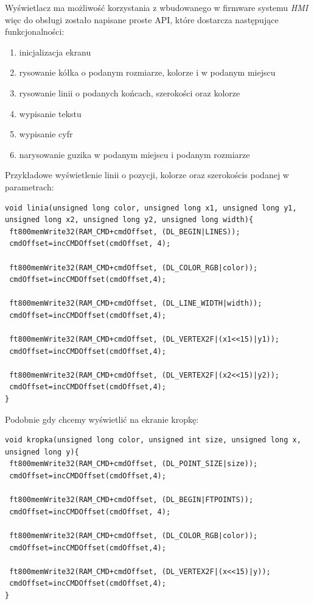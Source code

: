 \documentclass{xmgr}
\begin{document}
Wyświetlacz ma możliwość korzystania z wbudowanego w firmware systemu \emph{HMI} więc do obsługi zostało napisane proste API, które dostarcza następujące funkcjonalności:
 \begin{enumerate}
	\item inicjalizacja ekranu
	\item rysowanie kółka o podanym rozmiarze, kolorze i w podanym miejscu
	\item rysowanie linii o podanych końcach, szerokości oraz kolorze
	\item wypisanie tekstu
	\item wypisanie cyfr
	\item narysowanie guzika w podanym miejscu i podanym rozmiarze
\end{enumerate}

Przykładowe wyświetlenie linii o pozycji, kolorze oraz szerokościs podanej w parametrach:
\begin{lstlisting}[label=bot-dirs-alg,caption=Narysowanie linii na ekranie]
void linia(unsigned long color, unsigned long x1, unsigned long y1, 
unsigned long x2, unsigned long y2, unsigned long width){
 ft800memWrite32(RAM_CMD+cmdOffset, (DL_BEGIN|LINES));
 cmdOffset=incCMDOffset(cmdOffset, 4);
 
 ft800memWrite32(RAM_CMD+cmdOffset, (DL_COLOR_RGB|color));
 cmdOffset=incCMDOffset(cmdOffset,4);

 ft800memWrite32(RAM_CMD+cmdOffset, (DL_LINE_WIDTH|width));
 cmdOffset=incCMDOffset(cmdOffset,4);

 ft800memWrite32(RAM_CMD+cmdOffset, (DL_VERTEX2F|(x1<<15)|y1));
 cmdOffset=incCMDOffset(cmdOffset,4);
  
 ft800memWrite32(RAM_CMD+cmdOffset, (DL_VERTEX2F|(x2<<15)|y2));
 cmdOffset=incCMDOffset(cmdOffset,4);	
}
\end{lstlisting}

Podobnie gdy chcemy wyświetlić na ekranie kropkę:
\begin{lstlisting}[label=bot-dirs-alg,caption=Narysowanie kropki na ekranie]
void kropka(unsigned long color, unsigned int size, unsigned long x, 
unsigned long y){ 
 ft800memWrite32(RAM_CMD+cmdOffset, (DL_POINT_SIZE|size));
 cmdOffset=incCMDOffset(cmdOffset,4);

 ft800memWrite32(RAM_CMD+cmdOffset, (DL_BEGIN|FTPOINTS));
 cmdOffset=incCMDOffset(cmdOffset, 4);

 ft800memWrite32(RAM_CMD+cmdOffset, (DL_COLOR_RGB|color));
 cmdOffset=incCMDOffset(cmdOffset,4);
 
 ft800memWrite32(RAM_CMD+cmdOffset, (DL_VERTEX2F|(x<<15)|y));
 cmdOffset=incCMDOffset(cmdOffset,4);
}
\end{lstlisting}
\end{document}
